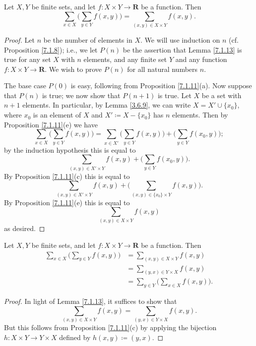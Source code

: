 \begin{lemma}\label{7.1.13}
Let \(X, Y\) be finite sets, and let \(f : X \times Y \to \mathbf{R}\) be a function.
Then
\[
    \sum_{x \in X} \bigg(\sum_{y \in Y} f(x, y)\bigg) = \sum_{(x, y) \in X \times Y} f(x, y).
\]
\end{lemma}

\begin{proof}
Let \(n\) be the number of elements in \(X\).
We will use induction on \(n\) (cf. Proposition \ref{7.1.8});
i.e., we let \(P(n)\) be the assertion that Lemma \ref{7.1.13} is true for any set \(X\) with \(n\) elements, and any finite set \(Y\) and any function \(f : X \times Y \to \mathbf{R}\).
We wish to prove \(P(n)\) for all natural numbers \(n\).

The base case \(P(0)\) is easy, following from Proposition \ref{7.1.11}(a).
Now suppose that \(P(n)\) is true;
we now show that \(P(n + 1)\) is true.
Let \(X\) be a set with \(n + 1\) elements.
In particular, by Lemma \ref{3.6.9}, we can write \(X = X' \cup \{x_0\}\), where \(x_0\) is an element of \(X\) and \(X' \coloneqq X - \{x_0\}\) has \(n\) elements.
Then by Proposition \ref{7.1.11}(e) we have
\[
    \sum_{x \in X} \bigg(\sum_{y \in Y} f(x, y)\bigg) = \sum_{x \in X'} \bigg(\sum_{y \in Y} f(x, y)\bigg) + \bigg(\sum_{y \in Y} f(x_0, y)\bigg);
\]
by the induction hypothesis this is equal to
\[
    \sum_{(x, y) \in X' \times Y} f(x, y) + \bigg(\sum_{y \in Y} f(x_0, y)\bigg).
\]
By Proposition \ref{7.1.11}(c) this is equal to
\[
    \sum_{(x, y) \in X' \times Y} f(x, y) + \bigg(\sum_{(x, y) \in \{x_0\} \times Y} f(x, y)\bigg).
\]
By Proposition \ref{7.1.11}(e) this is equal to
\[
    \sum_{(x, y) \in X \times Y} f(x, y)
\]
as desired.
\end{proof}

\begin{corollary}\label{7.1.14}
Let \(X, Y\) be finite sets, and let \(f : X \times Y \to \mathbf{R}\) be a function.
Then
\begin{align*}
\sum_{x \in X} \bigg(\sum_{y \in Y} f(x, y)\bigg) &= \sum_{(x, y) \in X \times Y} f(x, y) \\
&= \sum_{(y, x) \in Y \times X} f(x, y) \\
&= \sum_{y \in Y} \bigg(\sum_{x \in X} f(x, y)\bigg).
\end{align*}
\end{corollary}

\begin{proof}
In light of Lemma \ref{7.1.13}, it suffices to show that
\[
    \sum_{(x, y) \in X \times Y} f(x, y) = \sum_{(y, x) \in Y \times X} f(x, y).
\]
But this follows from Proposition \ref{7.1.11}(c) by applying the bijection \(h : X \times Y \to Y \times X\) defined by \(h(x, y) \coloneqq (y, x)\).
\end{proof}

